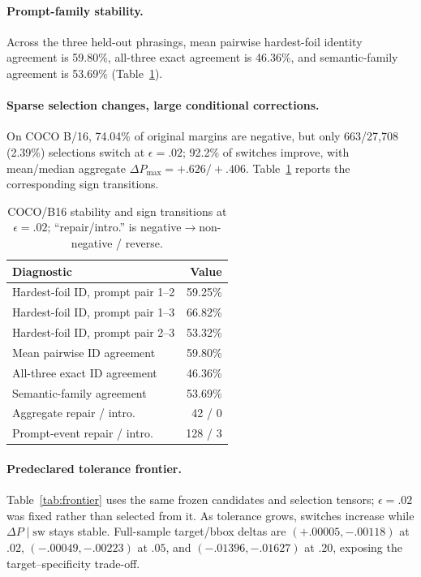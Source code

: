 \documentclass[10pt]{article}
\begin{document}
\paragraph{Prompt-family stability.}
Across the three held-out phrasings, mean pairwise hardest-foil identity agreement is
59.80\%, all-three exact agreement is 46.36\%, and semantic-family agreement is
53.69\% (Table~\ref{tab:diagnostics}).

\paragraph{Sparse selection changes, large conditional corrections.}
On COCO B/16, 74.04\% of original margins are negative, but only 663/27,708
(2.39\%) selections switch at $\epsilon=.02$; 92.2\% of switches improve, with
mean/median aggregate $\Delta P_{\max}=+.626/+.406$. Table~\ref{tab:diagnostics}
reports the corresponding sign transitions.

\begin{table}[!h]
\centering
\caption{COCO/B16 stability and sign transitions at $\epsilon=.02$; ``repair/intro.'' is negative$\to$non-negative / reverse.}
\label{tab:diagnostics}
\small
\setlength{\tabcolsep}{3.0pt}
\renewcommand{\arraystretch}{0.94}
\begin{tabular}{lr}
\toprule
Diagnostic & Value\\
\midrule
Hardest-foil ID, prompt pair 1--2 & 59.25\%\\
Hardest-foil ID, prompt pair 1--3 & 66.82\%\\
Hardest-foil ID, prompt pair 2--3 & 53.32\%\\
Mean pairwise ID agreement & 59.80\%\\
All-three exact ID agreement & 46.36\%\\
Semantic-family agreement & 53.69\%\\
Aggregate repair / intro. & 42 / 0\\
Prompt-event repair / intro. & 128 / 3\\
\bottomrule
\end{tabular}
\end{table}

\paragraph{Predeclared tolerance frontier.}
Table~\ref{tab:frontier} uses the same frozen candidates and selection tensors;
$\epsilon=.02$ was fixed rather than selected from it. As tolerance grows, switches
increase while $\Delta P\mid\mathrm{sw}$ stays stable. Full-sample target/bbox deltas
are $(+.00005,-.00118)$ at $.02$, $(-.00049,-.00223)$ at $.05$, and
$(-.01396,-.01627)$ at $.20$, exposing the target--specificity trade-off.
\end{document}
